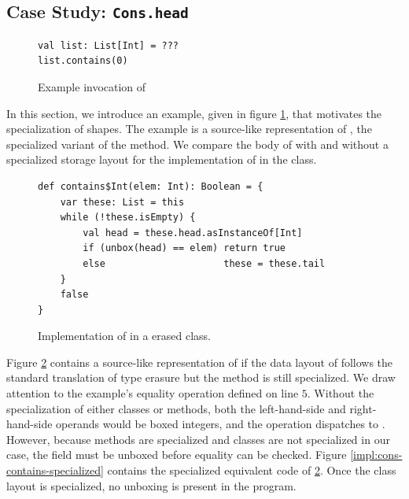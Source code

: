 \subsection{Case Study: \texttt{Cons.head}}

\begin{figure}[!htb]
\begin{verbatim}
val list: List[Int] = ???
list.contains(0)
\end{verbatim}
\caption{Example invocation of }
\label{example:list-contains-example}
\end{figure}

In this section, we introduce an example, given in figure \ref{example:list-contains-example}, that motivates the specialization of shapes.
The example is a source-like representation of , the specialized variant of the  method.
We compare the body of  with and without a specialized storage layout for the implementation of  in the  class.

\begin{figure}[!htb]
\begin{verbatim}
def contains$Int(elem: Int): Boolean = {
	var these: List = this
	while (!these.isEmpty) {
		val head = these.head.asInstanceOf[Int]
		if (unbox(head) == elem) return true
		else                     these = these.tail
	}
	false
}	
\end{verbatim}
\caption{Implementation of  in a erased  class.}
\label{impl:cons-contains-erased}
\end{figure}

Figure \ref{impl:cons-contains-erased} contains a source-like representation of  if the data layout of  follows the standard translation of type erasure but the method is still specialized.
We draw attention to the example's equality operation defined on line $5$.
Without the specialization of either classes or methods, both the left-hand-side and right-hand-side operands would be boxed integers, and the \scalainline{==} operation dispatches to .
However, because methods are specialized and classes are not specialized in our case, the  field must be unboxed before equality can be checked.
Figure \ref{impl:cons-contains-specialized} contains the specialized equivalent code of \ref{impl:cons-contains-erased}.
Once the class layout is specialized, no unboxing is present in the program.

